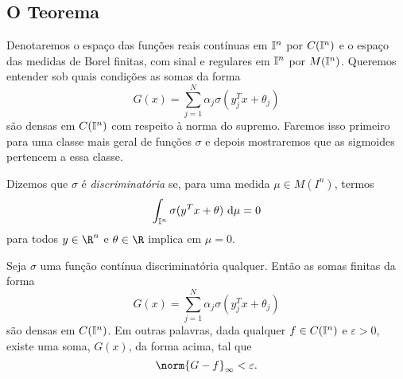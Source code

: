 \subsection{O Teorema}

Denotaremos o espaço das funções reais contínuas em \( \mathbb{I}^{ n } \) por \( C(\mathbb{I}^{ n }) \) e o espaço das medidas de Borel finitas, com sinal e regulares em \( \mathbb{I}^{ n } \) por \( M(\mathbb{I}^{ n }) \).
Queremos entender sob quais condições as somas da forma \[
    G(x) = \sum_{ j=1 }^{ N } \alpha_{ j } \sigma(y_{ j }^{ T }x + \theta_{ j })
\]
são densas em \( C(\mathbb{I}^{ n }) \) com respeito à norma do supremo.
Faremos isso primeiro para uma classe mais geral de funções \( \sigma \) e depois mostraremos que as sigmoides pertencem a essa classe.

\begin{defn}
    Dizemos que \( \sigma \) é \emph{discriminatória} se, para uma medida \( \mu \in M(I^{ n }) \), termos \[
        \int_{ \mathbb{I}^{ n } } \sigma(y^{ T }x + \theta)  \ \mathrm{d}\mu = 0
    \]
    para todos \( y \in \R^{ n } \) e \( \theta \in \R \) implica em \( \mu = 0 \).
\end{defn}

\begin{teo}
    Seja \( \sigma \) uma função contínua discriminatória qualquer.
    Então as somas finitas da forma \[
        G(x) = \sum_{ j=1 }^{ N } \alpha_{ j } \sigma(y_{ j }^{ T }x + \theta_{ j })
    \]
    são densas em \( C(\mathbb{I}^{ n }) \).
    Em outras palavras, dada qualquer \( f \in C(\mathbb{I}^{ n }) \) e \( \varepsilon > 0 \), existe uma soma, \( G(x) \), da forma acima, tal que \[
        \norm{ G - f }_{ \infty } < \varepsilon
    .\]
\end{teo}


